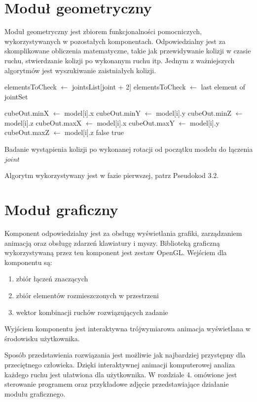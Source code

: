 \section{Moduł geometryczny}
Moduł geometryczny jest zbiorem funkcjonalności pomocniczych, wykorzystywanych w pozostałych komponentach. Odpowiedzialny jest za skomplikowane obliczenia matematyczne, takie jak przewidywanie kolizji w czasie ruchu, stwierdzanie kolizji po wykonanym ruchu itp. Jednym z ważniejszych algorytmów jest wyszukiwanie zaistniałych kolizji.

{\small
	\begin{pseudokod}[H]
	{
		elementsToCheck $\leftarrow$ jointsList[joint + 2]
	}
	{
		elementsToCheck $\leftarrow$ last element of jointSet
	}
		
	{
		{
			cubeOut.minX $\leftarrow$ model[i].x
		}
		{
			cubeOut.minY $\leftarrow$ model[i].y
		}
		{
			cubeOut.minZ $\leftarrow$ model[i].z
		}
		{
			cubeOut.maxX $\leftarrow$ model[i].x
		}
		{
			cubeOut.maxY $\leftarrow$ model[i].y
		}
		{
			cubeOut.maxZ $\leftarrow$ model[i].z
		}
	}
	{
		\Return false
	}
	{
		\Return true
	}
	\caption{Badanie wystąpienia kolizji po wykonanej rotacji od początku modelu do łączenia $joint$}\label{alg:mine}
	\end{pseudokod}
}

Algorytm wykorzystywany jest w fazie pierwszej, patrz Pseudokod 3.2.

\section{Moduł graficzny}
Komponent odpowiedzialny jest za obsługę wyświetlania grafiki, zarządzaniem animacją oraz obsługę zdarzeń klawiatury i myszy. Biblioteką graficzną wykorzystywaną przez ten komponent jest zestaw OpenGL\cite{OpenGL}.
Wejściem dla komponentu są:
\begin{enumerate}
\item zbiór łączeń znaczących
\item zbiór elementów rozmieszczonych w przestrzeni
\item wektor kombinacji ruchów rozwiązujących zadanie
\end{enumerate}

Wyjściem komponentu jest interaktywna trójwymiarowa animacja wyświetlana w środowisku użytkownika. 

Sposób przedstawienia rozwiązania jest możliwie jak najbardziej przystępny dla przeciętnego człowieka. Dzięki interaktywnej animacji komputerowej analiza każdego ruchu jest ułatwiona dla użytkownika. W rozdziale 4. omówione jest sterowanie programem oraz przykładowe zdjęcie przedstawiające działanie modułu graficznego.
